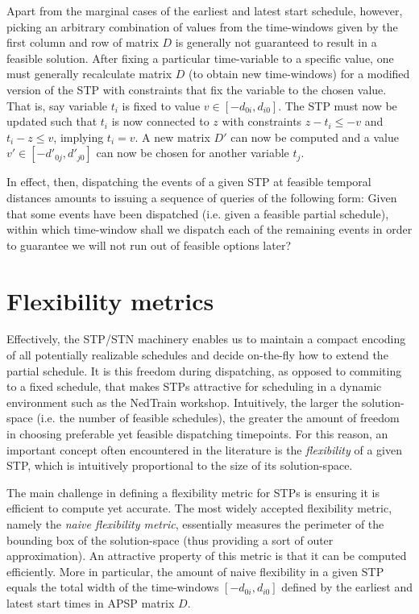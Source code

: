 	Apart from the marginal cases of the earliest and latest start schedule, however,
	picking an arbitrary combination of values from the time-windows given by 
	the first column and row of matrix $D$ is generally not guaranteed to result in a feasible solution.
	After fixing a particular time-variable to a specific value,
	one must generally recalculate matrix $D$ (to obtain new time-windows) for a modified version of the STP 
	with constraints that fix the variable to the chosen value. 
	That is, say variable $t_i$ is fixed to value $v \in [-d_{0i}, d_{i0}]$.
	The STP must now be updated such that $t_i$ is now connected to $z$ with constraints $z - t_i \leq -v$ and $t_i - z \leq v$, implying $t_i = v$.
	A new matrix $D'$ can now be computed and a value $v' \in [-d'_{0j}, d'_{j0}]$ can now be chosen for another variable $t_j$.

	In effect, then, dispatching the events of a given STP at feasible temporal distances 
	amounts to issuing a sequence of queries of the following form: 
	Given that some events have been dispatched (i.e. given a feasible partial schedule),
	within which time-window shall we dispatch each of the remaining events in order to guarantee we will not run out of feasible options later?

\section{Flexibility metrics}

	Effectively, the STP/STN machinery enables us to maintain a compact encoding of all potentially realizable schedules 
	and decide on-the-fly how to extend the partial schedule.
	It is this freedom during dispatching, as opposed to commiting to a fixed schedule,
	that makes STPs attractive for scheduling in a dynamic environment such as the NedTrain workshop.
	Intuitively, the larger the solution-space (i.e. the number of feasible schedules), 
	the greater the amount of freedom in choosing preferable yet feasible dispatching timepoints.
	For this reason, an important concept often encountered in the literature is the \emph{flexibility} of a given STP,
	which is intuitively proportional to the size of its solution-space.

	The main challenge in defining a flexibility metric for STPs is ensuring it is efficient to compute yet accurate.
	The most widely accepted flexibility metric, namely the \emph{naive flexibility metric}, 
	essentially measures the perimeter of the bounding box of the solution-space (thus providing a sort of outer approximation).
	An attractive property of this metric is that it can be computed efficiently.
	More in particular, the amount of naive flexibility in a given STP equals the total width of the time-windows $[-d_{0i}, d_{i0}]$ 
	defined by the earliest and latest start times in APSP matrix $D$.

